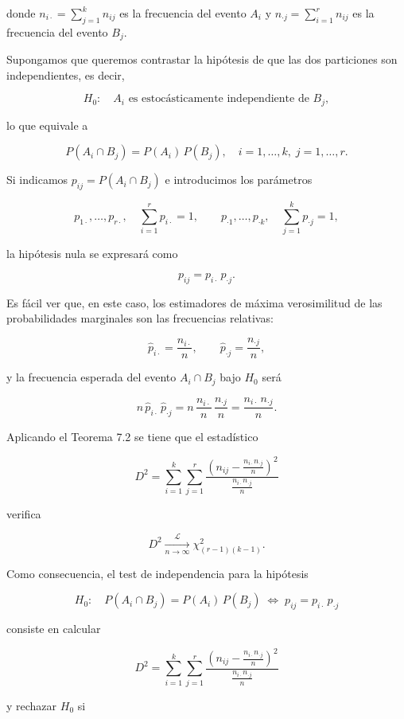 \documentclass[
]{article}
\begin{document}
donde \(n_{i\cdot}=\sum_{j=1}^{k} n_{ij}\) es la frecuencia del evento \(A_i\) y \(n_{\cdot j}=\sum_{i=1}^{r} n_{ij}\) es la frecuencia del evento \(B_j\).

Supongamos que queremos contrastar la hipótesis de que las dos particiones son independientes, es decir,

\[
H_{0}: \quad A_i \text{ es estocásticamente independiente de } B_j,
\]

lo que equivale a

\[
P(A_i \cap B_j)=P(A_i)\,P(B_j), \quad i=1,\ldots,k,\; j=1,\ldots,r.
\]

Si indicamos \(p_{ij}=P(A_i \cap B_j)\) e introducimos los parámetros

\[
p_{1\cdot},\ldots,p_{r\cdot},\quad \sum_{i=1}^{r} p_{i\cdot}=1,\qquad
p_{\cdot 1},\ldots,p_{\cdot k},\quad \sum_{j=1}^{k} p_{\cdot j}=1,
\]

la hipótesis nula se expresará como

\[
p_{ij}=p_{i\cdot}\,p_{\cdot j}.
\]

Es fácil ver que, en este caso, los estimadores de máxima verosimilitud de las probabilidades marginales son las frecuencias relativas:

\[
\hat p_{i\cdot}=\frac{n_{i\cdot}}{n}, \qquad \hat p_{\cdot j}=\frac{n_{\cdot j}}{n},
\]

y la frecuencia esperada del evento \(A_i \cap B_j\) bajo \(H_0\) será

\[
n\,\hat p_{i\cdot}\,\hat p_{\cdot j}
= n\,\frac{n_{i\cdot}}{n}\,\frac{n_{\cdot j}}{n}
= \frac{n_{i\cdot}\,n_{\cdot j}}{n}.
\]

Aplicando el Teorema 7.2 se tiene que el estadístico

\[
D^{2}=\sum_{i=1}^{k}\sum_{j=1}^{r}
\frac{\left(n_{ij}-\frac{n_{i\cdot}n_{\cdot j}}{n}\right)^{2}}
{\frac{n_{i\cdot}n_{\cdot j}}{n}}
\]

verifica

\[
D^{2}\xrightarrow[n\to\infty]{\mathcal{L}} \chi^{2}_{(r-1)(k-1)}.
\]

Como consecuencia, el test de independencia para la hipótesis

\[
H_{0}: \quad P(A_i\cap B_j)=P(A_i)\,P(B_j)
\;\Longleftrightarrow\;
p_{ij}=p_{i\cdot}\,p_{\cdot j}
\]

consiste en calcular

\[
D^{2}=\sum_{i=1}^{k}\sum_{j=1}^{r}
\frac{\left(n_{ij}-\frac{n_{i\cdot}n_{\cdot j}}{n}\right)^{2}}
{\frac{n_{i\cdot}n_{\cdot j}}{n}}
\]

y rechazar \(H_{0}\) si
\end{document}
